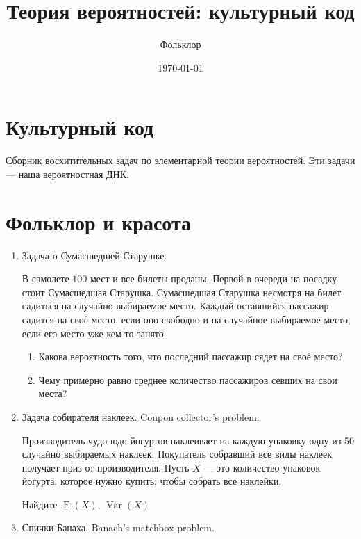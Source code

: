 \documentclass{tufte-handout}
\title{Теория вероятностей: культурный код}
\author{Фольклор}
\date{\today}
\DeclareMathOperator{\Var}{Var}
\DeclareMathOperator{\E}{E}
\begin{document}
\maketitle

\section{Культурный код}

Сборник восхитительных задач по элементарной теории вероятностей. Эти задачи --- наша вероятностная ДНК.

\section{Фольклор и красота}


\begin{enumerate}
\item Задача о Сумасшедшей Старушке.

В самолете $100$ мест и все билеты проданы. Первой в очереди на посадку стоит Сумасшедшая Старушка. Сумасшедшая Старушка несмотря на билет садиться на случайно выбираемое место. Каждый оставшийся пассажир садится на своё место, если оно свободно и на случайное выбираемое место, если его место уже кем-то занято.

\begin{enumerate}
\item Какова вероятность того, что последний пассажир сядет на своё место?
\item Чему примерно равно среднее количество пассажиров севших на свои места?
\end{enumerate}


\item Задача собирателя наклеек. Coupon collector's problem. 

Производитель чудо-юдо-йогуртов наклеивает на каждую упаковку одну из 50 случайно выбираемых наклеек. Покупатель собравший все виды наклеек получает приз от производителя. Пусть $X$ --- это количество упаковок йогурта, которое нужно купить, чтобы собрать все наклейки.

Найдите  $\E(X)$, $\Var(X)$

\item Спички Банаха. Banach's matchbox problem.


\end{enumerate}
\end{document}
